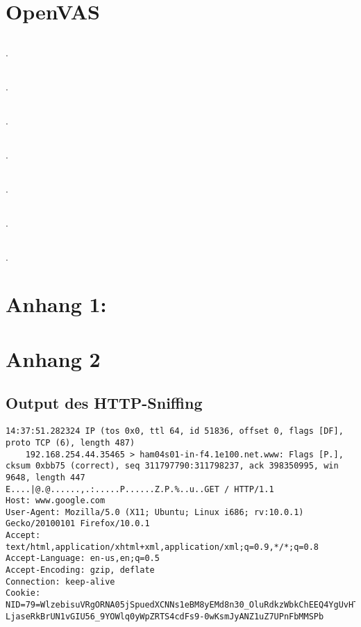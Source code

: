 \documentclass[twoside]{article}
\begin{document}
\section{OpenVAS}
\subsection{}.
\subsection{}.
\subsection{}.
\subsection{}.
\subsection{}.
\subsection{}.
\subsection{}.

\newpage
\section*{Anhang 1:}

\section*{Anhang 2}
\subsection*{Output des HTTP-Sniffing}
\begin{lstlisting}
14:37:51.282324 IP (tos 0x0, ttl 64, id 51836, offset 0, flags [DF], proto TCP (6), length 487)
    192.168.254.44.35465 > ham04s01-in-f4.1e100.net.www: Flags [P.], cksum 0xbb75 (correct), seq 311797790:311798237, ack 398350995, win 9648, length 447
E....|@.@......,.:.....P......Z.P.%..u..GET / HTTP/1.1
Host: www.google.com
User-Agent: Mozilla/5.0 (X11; Ubuntu; Linux i686; rv:10.0.1) Gecko/20100101 Firefox/10.0.1
Accept: text/html,application/xhtml+xml,application/xml;q=0.9,*/*;q=0.8
Accept-Language: en-us,en;q=0.5
Accept-Encoding: gzip, deflate
Connection: keep-alive
Cookie: NID=79=WlzebisuVRgORNA05jSpuedXCNNs1eBM8yEMd8n30_OluRdkzWbkChEEQ4YgUvHTWB3a64hs LjaseRkBrUN1vGIU56_9YOWlq0yWpZRTS4cdFs9-0wKsmJyANZ1uZ7UPnFbMMSPb
\end{lstlisting}
\end{document}
